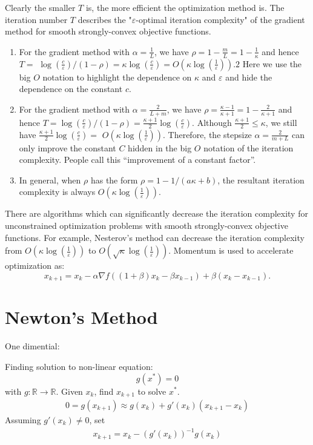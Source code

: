 \documentclass[11pt,a4paper]{article}
\begin{document}
Clearly the smaller $T$ is, the more efficient the optimization method is. The iteration number $T$ describes the "$\varepsilon$-optimal iteration complexity" of the gradient method for smooth strongly-convex objective functions.
\begin{enumerate}[$\bullet$]
    \item For the gradient method with $\alpha=\frac{1}{L}$, we have $\rho=1-\frac{m}{L}=1-\frac{1}{\kappa}$ and hence $T=$ $\log \left(\frac{c}{\varepsilon}\right) /(1-\rho)=\kappa \log \left(\frac{c}{\varepsilon}\right)=O\left(\kappa \log \left(\frac{1}{\varepsilon}\right)\right) .2$ Here we use the big $O$ notation to highlight the dependence on $\kappa$ and $\varepsilon$ and hide the dependence on the constant $c$.
    \item For the gradient method with $\alpha=\frac{2}{L+m}$, we have $\rho=\frac{\kappa-1}{\kappa+1}=1-\frac{2}{\kappa+1}$ and hence $T=\log \left(\frac{c}{\varepsilon}\right) /(1-\rho)=\frac{\kappa+1}{2} \log \left(\frac{c}{\varepsilon}\right) .$ Although $\frac{\kappa+1}{2} \leq \kappa$, we still have $\frac{\kappa+1}{2} \log \left(\frac{c}{\varepsilon}\right)=$ $O\left(\kappa \log \left(\frac{1}{\varepsilon}\right)\right)$. Therefore, the stepsize $\alpha=\frac{2}{m+L}$ can only improve the constant $C$ hidden in the big $O$ notation of the iteration complexity. People call this “improvement of a constant factor”.
    \item In general, when $\rho$ has the form $\rho=1-1 /(a \kappa+b)$, the resultant iteration complexity is always $O\left(\kappa \log \left(\frac{1}{\varepsilon}\right)\right)$.
\end{enumerate}

There are algorithms which can significantly decrease the iteration complexity for unconstrained optimization problems with smooth strongly-convex objective functions. For example, Nesterov's method can decrease the iteration complexity from $O\left(\kappa \log \left(\frac{1}{\varepsilon}\right)\right)$ to $O\left(\sqrt{\kappa} \log \left(\frac{1}{\varepsilon}\right)\right)$. Momentum is used to accelerate optimization as:
$$
x_{k+1}=x_{k}-\alpha \nabla f\left((1+\beta) x_{k}-\beta x_{k-1}\right)+\beta\left(x_{k}-x_{k-1}\right) .
$$

\section{Newton's Method}
One dimential:

Finding solution to non-linear equation:
$$g(x^*)=0$$ with $g:\mathbb{R} \rightarrow \mathbb{R}$. Given $x_k$, find $x_{k+1}$ to solve $x^*$.
\begin{equation}
    \begin{aligned}
        0=g(x_{k+1})\approx g(x_k)+g'(x_k)(x_{k+1}-x_k)
    \end{aligned}
    \nonumber
\end{equation}
Assuming $g'(x_k)\neq 0$, set
\begin{equation}
    \begin{aligned}
        x_{k+1}=x_k-(g'(x_k))^{-1}g(x_k)
    \end{aligned}
    \nonumber
\end{equation}
\end{document}
